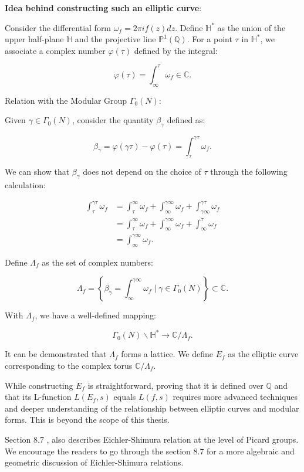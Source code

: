 \textbf{Idea behind constructing such an elliptic curve}:

Consider the differential form \( \omega_{f} = 2\pi i f(z) dz \). Define \( \mathbb{H}^{*} \) as the union of the upper half-plane \( \mathbb{H} \) and the projective line \( \mathbb{P}^{1}(\mathbb{Q}) \). For a point \( \tau \) in \( \mathbb{H}^{*} \), we associate a complex number \( \varphi(\tau) \) defined by the integral:

\[
\varphi(\tau) = \int_{\infty}^{\tau} \omega_{f} \in \mathbb{C}.
\]

Relation with the Modular Group \( \Gamma_{0}(N) \):

Given \( \gamma \in \Gamma_{0}(N) \), consider the quantity \( \beta_{\gamma} \) defined as:

\[
\beta_{\gamma} = \varphi(\gamma\tau) - \varphi(\tau) = \int_{\tau}^{\gamma\tau} \omega_{f}.
\]

We can show that \( \beta_{\gamma} \) does not depend on the choice of \( \tau \) through the following calculation:

\[
\begin{aligned}
\int_{\tau}^{\gamma\tau} \omega_{f} &= \int_{\tau}^{\infty} \omega_{f} + \int_{\infty}^{\gamma\infty} \omega_{f} + \int_{\gamma\infty}^{\gamma\tau} \omega_{f} \\
&= \int_{\tau}^{\infty} \omega_{f} + \int_{\infty}^{\gamma\infty} \omega_{f} + \int_{\infty}^{\tau} \omega_{f} \\
&= \int_{\infty}^{\gamma\infty} \omega_{f}.
\end{aligned}
\]

Define \( \Lambda_{f} \) as the set of complex numbers:

\[
\Lambda_{f} = \left\{ \beta_{\gamma} = \int_{\infty}^{\gamma\infty} \omega_{f} \mid \gamma \in \Gamma_{0}(N) \right\} \subset \mathbb{C}.
\]

With \( \Lambda_{f} \), we have a well-defined mapping:

\[
\Gamma_{0}(N) \backslash \mathbb{H}^{*} \rightarrow \mathbb{C} / \Lambda_{f}.
\]

It can be demonstrated that \( \Lambda_{f} \) forms a lattice. We define \( E_{f} \) as the elliptic curve corresponding to the complex torus \( \mathbb{C} / \Lambda_{f} \).

While constructing \( E_{f} \) is straightforward, proving that it is defined over \( \mathbb{Q} \) and that its L-function \( L(E_{f}, s) \) equals \( L(f, s) \) requires more advanced techniques and deeper understanding of the relationship between elliptic curves and modular forms. This is beyond the scope of this thesis.

Section 8.7 \cite{diamond2005first}, also describes Eichler-Shimura relation at the level of Picard groups. We encourage the readers to go through the section 8.7 for a more algebraic and geometric discussion of Eichler-Shimura relations. 
